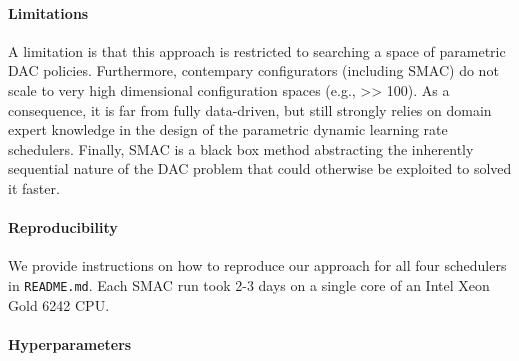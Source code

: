 \documentclass[11pt, final]{article}
\begin{document}
\paragraph{Limitations}
A limitation is that this approach is restricted to searching a space of parametric DAC policies. Furthermore, contempary configurators (including SMAC) do not scale to very high dimensional configuration spaces (e.g., >> 100).
As a consequence, it is far from fully data-driven, but still strongly relies on domain expert knowledge in the design of the parametric dynamic learning rate schedulers.
Finally, SMAC is a black box method abstracting the inherently sequential nature of the DAC problem that could otherwise be exploited to solved it faster.

\paragraph{Reproducibility}
We provide instructions on how to reproduce our approach for all four schedulers in \texttt{README.md}.
Each SMAC run took 2-3 days on a single core of an Intel Xeon Gold 6242 CPU.

\paragraph{Hyperparameters}


\end{document}
